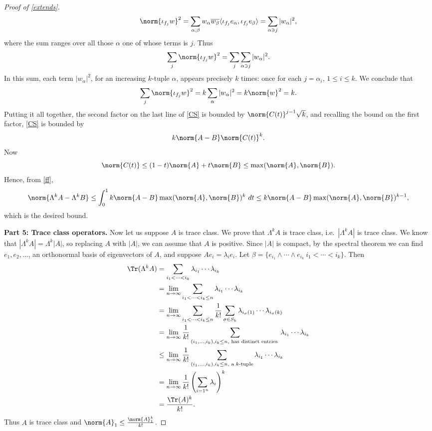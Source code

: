\documentclass[12pt]{amsart}
\begin{document}
\begin{proof}[Proof of \cref{extends}]
\[\norm{\iota_{f_j}w}^2 = \sum_{\alpha,\beta}w_\alpha\overline{w_\beta}\langle \iota_{f_j}e_\alpha,\iota_{f_j}e_\beta\rangle = \sum_{\alpha\ni j} |w_\alpha|^2,\] where the sum ranges over all those $\alpha$ one of whose terms is $j$.
Thus 
\[\sum_j \norm{\iota_{f_j}w}^2 = \sum_{j}\sum_{\alpha \ni j} |w_\alpha|^2.\] In this sum, each term $|w_\alpha|^2$, for an increasing $k$-tuple $\alpha$, appears precisely $k$ times: once for each $j = \alpha_i$, $1 \leq i \leq k$. We conclude that
\[\sum_j \norm{\iota_{f_j}w}^2 = k\sum_{\alpha} |w_\alpha|^2 = k\norm{w}^2 = k.\] Putting it all together, the second factor on the last line of \eqref{CS} is bounded by
$\norm{C(t)}^{j-1}\sqrt{k}$, and recalling the bound on the first factor, \eqref{CS} is bounded by
\[k\norm{A-B}\norm{C(t)}^k.\] Now \[\norm{C(t)} \leq (1-t)\norm{A} + t\norm{B} \leq \max(\norm{A},\norm{B}).\] Hence, from \eqref{ff},
\[\norm{\Lambda^k A - \Lambda^k B} \leq \int_0^1 k\norm{A-B}\max(\norm{A},\norm{B})^k\ dt \leq k\norm{A-B}\max(\norm{A},\norm{B})^{k-1},\] which is the desired bound.


\textbf{Part 5: Trace class operators.} Now let us suppose $A$ is trace class. We prove that $\Lambda^k A$ is trace class, i.e.\ $|\Lambda^k A|$ is trace class. We know that $|\Lambda^k A| = \Lambda^k |A|$, so replacing $A$ with $|A|$, we can assume that $A$ is positive. Since $|A|$ is compact, by the spectral theorem we can find $e_1,e_2,\ldots$, an orthonormal basis of eigenvectors of $A$, and suppose $Ae_i = \lambda_i e_i$. Let $\beta = \{e_{i_1}\wedge \cdots \wedge e_{i_k}\: i_1 < \cdots < i_k\}$. Then 
\begin{align*}
\Tr(\Lambda^k A) &= \sum_{i_1 < \cdots < i_k} \lambda_{i_1}\cdots\lambda_{i_k}\\ 
&= \lim_{n \to \infty}\sum_{i_1 < \cdots < i_k \leq n} \lambda_{i_1}\cdots\lambda_{i_k}\\
&= \lim_{n \to \infty}\sum_{i_1 < \cdots < i_k \leq n}\frac{1}{k!}\sum_{\sigma \in S_k}\lambda_{i_\sigma(1)}\cdots\lambda_{i_\sigma(k)}\\
&= \lim_{n \to \infty}\frac{1}{k!}\sum_{(i_1,\ldots,i_k), i_k \leq n, \text{ has distinct entries }}\lambda_{i_1}\cdots\lambda_{i_k}\\
&\leq \lim_{n \to \infty}\frac{1}{k!}\sum_{(i_1,\ldots,i_k), i_k \leq n, \text{ a }k\text{-tuple}}\lambda_{i_1}\cdots\lambda_{i_k}\\
&= \lim_{n \to \infty}\frac{1}{k!}\left(\sum_{i=1^n} \lambda_i\right)^k\\
&= \frac{\Tr(A)^k}{k!}.
\end{align*}
Thus $A$ is trace class and $\norm{A}_1 \leq \frac{\norm{A}_1^k}{k!}$.


\end{proof}
\end{document}
